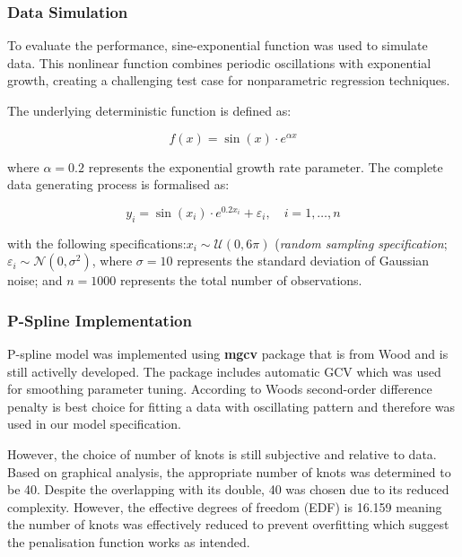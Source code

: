 \documentclass[8pt,twocolumn]{article}
\begin{document}
\subsubsection{Data Simulation}

To evaluate the performance, sine-exponential function was used to simulate data.
This nonlinear function combines periodic oscillations with exponential growth, creating a
challenging test case for nonparametric regression techniques.

The underlying deterministic function is defined as:

$$f(x) = \sin(x) \cdot e^{\alpha x}$$

where $\alpha = 0.2$ represents the exponential growth rate parameter.
The complete data generating process is formalised as:

$$y_i = \sin(x_i) \cdot e^{0.2x_i} + \varepsilon_i, \quad i = 1,\ldots,n$$

with the following specifications:$x_i \sim \mathcal{U}(0, 6\pi)$ (\emph{random sampling specification};
$\varepsilon_i \sim \mathcal{N}(0, \sigma^2)$, where $\sigma = 10$ represents the standard deviation of Gaussian noise; and
$n = 1000$ represents the total number of observations.

\subsubsection{P-Spline Implementation}

P-spline model was implemented using \textbf{mgcv} package that is from Wood \cite{mgcv} and is still activelly developed.
The package includes automatic GCV which was used for smoothing parameter tuning.
According to Woods \cite{woods2017} second-order difference penalty is best choice for fitting
a data with oscillating pattern and therefore was used in our model specification.

However, the choice of number of knots is still subjective and relative to data. Based on
graphical analysis, the appropriate number of knots was determined to be 40. Despite the overlapping with
its double, 40 was chosen due to its reduced complexity. However, the effective degrees of freedom (EDF) is 16.159 meaning the number of knots was effectively reduced to prevent overfitting which suggest the penalisation function works as intended.
\end{document}
